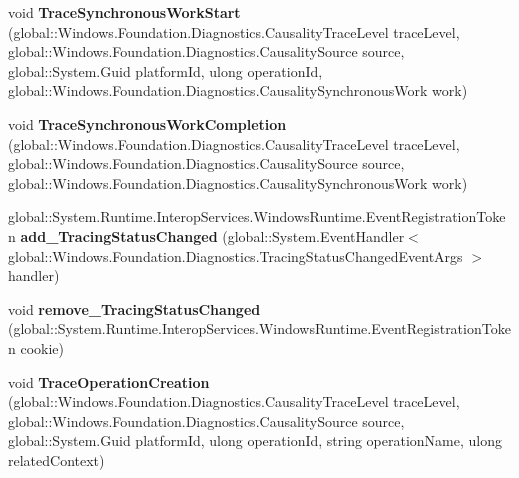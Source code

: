 \begin{DoxyCompactItemize}
void {\bfseries Trace\+Synchronous\+Work\+Start} (global\+::\+Windows.\+Foundation.\+Diagnostics.\+Causality\+Trace\+Level trace\+Level, global\+::\+Windows.\+Foundation.\+Diagnostics.\+Causality\+Source source, global\+::\+System.\+Guid platform\+Id, ulong operation\+Id, global\+::\+Windows.\+Foundation.\+Diagnostics.\+Causality\+Synchronous\+Work work)
\item 
\mbox{\label{interface_windows_1_1_foundation_1_1_diagnostics_1_1_i_async_causality_tracer_statics_a1543ef1de5733e88b1cf2a3424c199f5}} 
void {\bfseries Trace\+Synchronous\+Work\+Completion} (global\+::\+Windows.\+Foundation.\+Diagnostics.\+Causality\+Trace\+Level trace\+Level, global\+::\+Windows.\+Foundation.\+Diagnostics.\+Causality\+Source source, global\+::\+Windows.\+Foundation.\+Diagnostics.\+Causality\+Synchronous\+Work work)
\item 
\mbox{\label{interface_windows_1_1_foundation_1_1_diagnostics_1_1_i_async_causality_tracer_statics_adecd1f58d29fb341c2489d08610ac331}} 
global\+::\+System.\+Runtime.\+Interop\+Services.\+Windows\+Runtime.\+Event\+Registration\+Token {\bfseries add\+\_\+\+Tracing\+Status\+Changed} (global\+::\+System.\+Event\+Handler$<$ global\+::\+Windows.\+Foundation.\+Diagnostics.\+Tracing\+Status\+Changed\+Event\+Args $>$ handler)
\item 
\mbox{\label{interface_windows_1_1_foundation_1_1_diagnostics_1_1_i_async_causality_tracer_statics_a0b28a0699db651012d252a2063f84c0a}} 
void {\bfseries remove\+\_\+\+Tracing\+Status\+Changed} (global\+::\+System.\+Runtime.\+Interop\+Services.\+Windows\+Runtime.\+Event\+Registration\+Token cookie)
\item 
\mbox{\label{interface_windows_1_1_foundation_1_1_diagnostics_1_1_i_async_causality_tracer_statics_a38bdec695d719f8d62636334dcfb8dc5}} 
void {\bfseries Trace\+Operation\+Creation} (global\+::\+Windows.\+Foundation.\+Diagnostics.\+Causality\+Trace\+Level trace\+Level, global\+::\+Windows.\+Foundation.\+Diagnostics.\+Causality\+Source source, global\+::\+System.\+Guid platform\+Id, ulong operation\+Id, string operation\+Name, ulong related\+Context)

\end{DoxyCompactItemize}
